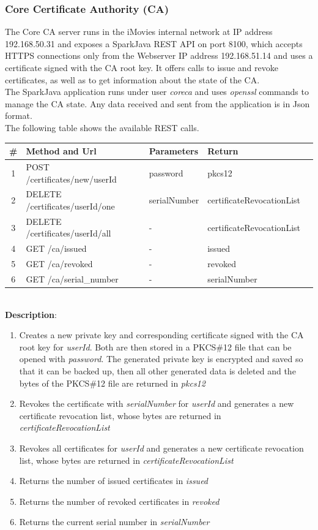\documentclass[english]{article}
\begin{document}
\subsubsection{Core Certificate Authority (CA)}
The Core CA server runs in the iMovies internal network at IP address 192.168.50.31 and exposes a SparkJava REST API on port 8100, which accepts HTTPS connections only from the Webserver IP address 192.168.51.14 and uses a certificate signed with the CA root key. It offers calls to issue and revoke certificates, as well as to get information about the state of the CA.\\
The SparkJava application runs under user \emph{coreca} and uses \emph{openssl} commands to manage the CA state. Any data received and sent from the application is in Json format.\\
The following table shows the available REST calls.
\\
\begin{tabular} {| c | l | l | l | l |}
\hline
\textbf{\#} & \textbf{Method and Url} & \textbf{Parameters} & \textbf{Return}\\
\hline
1 & POST /certificates/new/userId & password & pkcs12\\
\hline
2 & DELETE /certificates/userId/one & serialNumber & certificateRevocationList\\
\hline
3 & DELETE /certificates/userId/all & - & certificateRevocationList\\
\hline
4 & GET /ca/issued & - & issued\\
\hline
5 & GET /ca/revoked & - & revoked\\
\hline
6 & GET /ca/serial\_number & - & serialNumber\\
\hline
\end{tabular}
\\
\textbf{Description}:
\begin{enumerate}
\item Creates a new private key and corresponding certificate signed with the CA root key for \emph{userId}. Both are then stored in a PKCS\#12 file that can be opened with \emph{password}. The generated private key is encrypted and saved so that it can be backed up, then all other generated data is deleted and the bytes of the PKCS\#12 file are returned in \emph{pkcs12}
\item Revokes the certificate with \emph{serialNumber} for \emph{userId} and generates a new certificate revocation list, whose bytes are returned in \emph{certificateRevocationList}
\item Revokes all certificates for \emph{userId} and generates a new certificate revocation list, whose bytes are returned in \emph{certificateRevocationList}
\item Returns the number of issued certificates in \emph{issued}
\item Returns the number of revoked certificates in \emph{revoked}
\item Returns the current serial number in \emph{serialNumber}
\end{enumerate}
\end{document}
